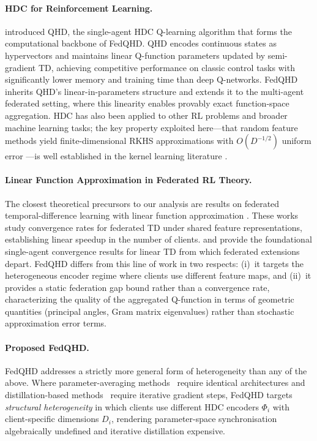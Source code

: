 \paragraph{HDC for Reinforcement Learning.}
\citet{ni2022qhd} introduced QHD, the single-agent HDC Q-learning algorithm that forms the computational backbone of FedQHD. QHD encodes continuous states as hypervectors and maintains linear Q-function parameters updated by semi-gradient TD, achieving competitive performance on classic control tasks with significantly lower memory and training time than deep Q-networks. FedQHD inherits QHD's linear-in-parameters structure and extends it to the multi-agent federated setting, where this linearity enables provably exact function-space aggregation.
HDC has also been applied to other RL problems and broader machine learning tasks; the key property exploited here—that random feature methods yield finite-dimensional RKHS approximations with $O(D^{-1/2})$ uniform error \citep{rahimi2007random,rudi2017generalization}—is well established in the kernel learning literature \citep{bach2015equivalence}.

\paragraph{Linear Function Approximation in Federated RL Theory.}
The closest theoretical precursors to our analysis are results on federated temporal-difference learning with linear function approximation \citep{wang2024federated,khodadadian2022federated}.
These works study convergence rates for federated TD under shared feature representations, establishing linear speedup in the number of clients.
\citet{tsitsiklis1997analysis} and \citet{bhandari2018finite} provide the foundational single-agent convergence results for linear TD from which federated extensions depart.
FedQHD differs from this line of work in two respects: (i)~it targets the heterogeneous encoder regime where clients use different feature maps, and (ii)~it provides a static federation gap bound rather than a convergence rate, characterizing the quality of the aggregated Q-function in terms of geometric quantities (principal angles, Gram matrix eigenvalues) rather than stochastic approximation error terms.

\paragraph{Proposed FedQHD.}
FedQHD addresses a strictly more general form of heterogeneity than any of the above.
Where parameter-averaging methods~\cite{jin2022federated} require identical architectures and distillation-based methods~\cite{shen2023fedhpd,teh2017distral} require iterative gradient steps, FedQHD targets \emph{structural heterogeneity} in which clients use different HDC encoders $\Phi_i$ with client-specific dimensions $D_i$, rendering parameter-space synchronisation algebraically undefined and iterative distillation expensive.


